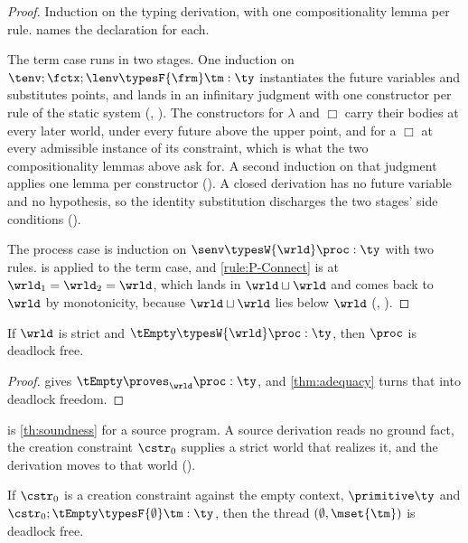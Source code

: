 \begin{proof}
  Induction on the typing derivation, with one compositionality lemma
  per rule.  names the declaration for each.

  The term case runs in two stages. One induction on
  $\tenv ; \fctx ; \lenv \typesF{\frm} \tm : \ty$ instantiates the future
  variables and substitutes points, and lands in an infinitary judgment
  with one constructor per rule of the static system
  (, ). The constructors for
  $\lambda$ and $\Box$ carry their bodies at every later world, under
  every future above the upper point, and for a $\Box$ at every
  admissible instance of its constraint, which is what the two
  compositionality lemmas above ask for. A second induction on that
  judgment applies one lemma per constructor
  (). A closed derivation has no future
  variable and no hypothesis, so the identity substitution discharges
  the two stages' side conditions ().

  The process case is induction on $\senv \typesW{\wrld} \proc : \ty$ with two
  rules.  is  applied to the term case,
  and \ref{rule:P-Connect} is  at
  $\wrld_1 = \wrld_2 = \wrld$, which lands in $\wrld \sqcup \wrld$ and
  comes back to $\wrld$ by monotonicity, because $\wrld \sqcup \wrld$
  lies below $\wrld$ (, ).
\end{proof}

\begin{theorem}
\label{th:soundness}
  If $\wrld$ is strict and $\tEmpty \typesW{\wrld} \proc : \ty$, then
  $\proc$ is deadlock free.
\end{theorem}

\begin{proof}
   gives $\tEmpty \proves_{\wrld} \proc : \ty$, and
  \cref{thm:adequacy} turns that into deadlock freedom.
\end{proof}

 is \cref{th:soundness} for a source program.
A source derivation reads no ground fact, the creation constraint
$\cstr_0$ supplies a strict world that realizes it, and the derivation
moves to that world ().

\begin{theorem}
\label{thm:soundness-source}
  If $\cstr_0$ is a creation constraint against the empty context,
  $\primitive \ty$ and $\cstr_0 ; \tEmpty \typesF{\emptyset} \tm : \ty$,
  then the thread $(\emptyset, \mset{\tm})$ is deadlock free.
\end{theorem}

